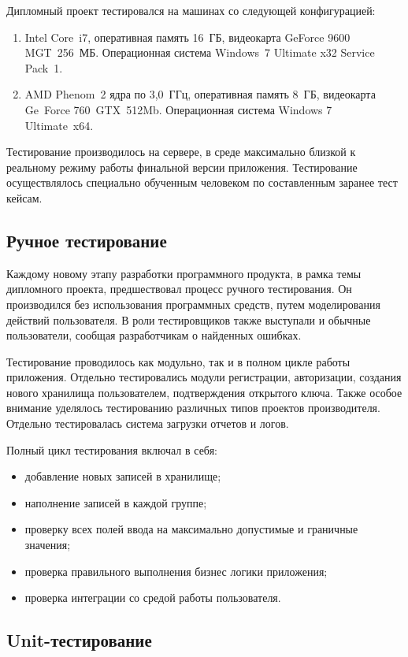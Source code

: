Дипломный проект тестировался на машинах со следующей конфигурацией:
\begin{enumerate}
  \item Intel Core~i7, оперативная память 16~ГБ, видеокарта GeForce 9600 MGT~256~МБ. Операционная система Windows~7 Ultimate x32 Service Pack~1.
  \item AMD Phenom~2 ядра по 3,0~ГГц, оперативная память 8~ГБ, видеокарта Ge~Force 760~GTX~512Mb. Операционная система Windows 7 Ultimate~x64.
\end{enumerate}

Тестирование производилось на сервере, в среде максимально близкой к реальному режиму работы финальной версии приложения. Тестирование осуществлялось специально обученным человеком по составленным заранее тест кейсам.

\subsection{Ручное тестирование}
\label{sec:practice:technology_used:hand_test}

Каждому новому этапу разработки программного продукта, в рамка темы дипломного проекта, предшествовал процесс ручного тестирования. Он производился без использования программных средств,  путем моделирования действий пользователя. В роли тестировщиков также выступали и обычные пользователи, сообщая разработчикам о найденных ошибках.

Тестирование проводилось как модульно, так и в полном цикле работы приложения.
Отдельно тестировались модули регистрации, авторизации, создания нового хранилища пользователем, подтверждения открытого ключа. Также особое внимание уделялось тестированию различных типов проектов производителя. Отдельно тестировалась система загрузки отчетов и логов.

Полный цикл тестирования включал в себя:
\begin{itemize}
  \item добавление новых записей в хранилище;
  \item наполнение записей в каждой группе;
  \item проверку всех полей ввода на максимально допустимые и граничные значения;
  \item проверка правильного выполнения бизнес логики приложения;
  \item проверка интеграции со средой работы пользователя.
\end{itemize}

\subsection{Unit-тестирование}
\label{sec:practice:technology_used:unit}


